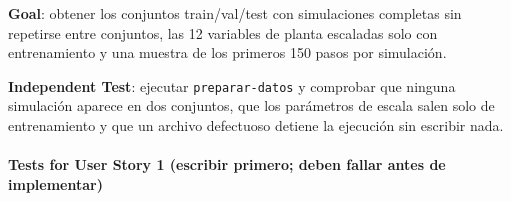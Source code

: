 \documentclass[12pt,a4paper]{article}
\newenvironment{documentogenerado}[2]{%
  \def\doccomando{#1}\def\docruta{#2}%
  \par\begingroup\small\setstretch{1.15}\sloppy%
}{\endgroup\par\medskip}
\begin{document}
\begin{documentogenerado}{/speckit-tasks (fase 7: /speckit-converge)}{specs\slash 001-preparacion-datos\slash tasks.md}
\textbf{Goal}: obtener los conjuntos train/\hspace{0pt}val/\hspace{0pt}test con simulaciones completas sin repetirse entre conjuntos, las 12 variables de planta escaladas solo con entrenamiento y una muestra de los primeros 150 pasos por simulación.

\textbf{Independent Test}: ejecutar \texttt{preparar-\allowbreak{}datos} y comprobar que ninguna simulación aparece en dos conjuntos, que los parámetros de escala salen solo de entrenamiento y que un archivo defectuoso detiene la ejecución sin escribir nada.

\paragraph{Tests for User Story 1 (escribir primero; deben fallar antes de implementar)}


\end{documentogenerado}
\end{document}
